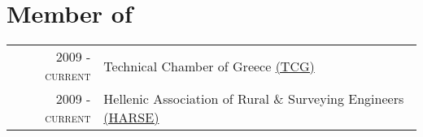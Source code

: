 \documentclass[9pt]{extarticle} %
\begin{document}
\section{Member of}
\begin{longtable}{rp{13cm}}
\textsc{2009 - current} & Technical Chamber of Greece \href{http://web.tee.gr/}{(TCG)}\\
\textsc{2009 - current} & Hellenic Association of Rural \& Surveying Engineers \href{http://www.psdatm.gr/}{(HARSE)}\\
\end{longtable}
\medskip

%
\end{document}
